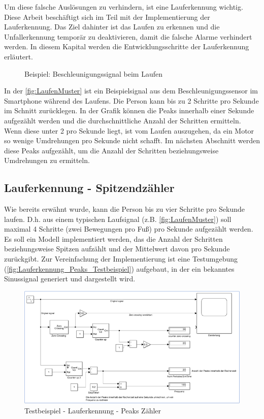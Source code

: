 Um diese falsche Auslösungen zu verhindern, ist eine Lauferkennung wichtig. Diese Arbeit beschäftigt sich im Teil mit der Implementierung der Lauferkennung. Das Ziel dahinter ist das Laufen zu erkennen und die Unfallerkennung temporär zu deaktivieren, damit die falsche Alarme verhindert werden.
In diesem Kapital werden die Entwicklungsschritte der Lauferkennung erläutert.

%

\begin{figure}[H]
	\centering
	\caption{Beispiel: Beschleunigungssignal beim Laufen}
	\label{fig:LaufenMuster}
\end{figure}
In der \autoref{fig:LaufenMuster} ist ein Beispielsignal aus dem Beschleunigungssensor im Smartphone während des Laufens. Die Person kann bis zu 2 Schritte pro Sekunde im Schnitt zurücklegen. In der Grafik können die Peaks innerhalb einer Sekunde aufgezählt werden und die durchschnittliche Anzahl der Schritten ermitteln. Wenn diese unter 2 pro Sekunde liegt, ist vom Laufen auszugehen, da ein Motor so wenige Umdrehungen pro Sekunde nicht schafft. Im nächsten Abschnitt werden diese Peaks aufgezählt, um die Anzahl der Schritten beziehungsweise Umdrehungen zu ermitteln.
%
\subsection{Lauferkennung - Spitzendzähler} \label{abs:PeaksAufzaehlen}

Wie bereits erwähnt wurde, kann die Person bis zu vier Schritte pro Sekunde laufen. D.h. aus einem typischen Laufsignal (z.B. \autoref{fig:LaufenMuster}) soll maximal 4 Schritte (zwei Bewegungen pro Fuß) pro Sekunde aufgezählt werden.
Es soll ein Modell implementiert werden, das die Anzahl der Schritten beziehungsweise Spitzen aufzählt und der Mittelwert davon pro Sekunde zurückgibt. Zur Vereinfachung der Implementierung ist eine Testumgebung (\autoref{fig:Lauferkennung_Peaks_Testbeispiel}) aufgebaut, in der ein bekanntes Sinussignal generiert und dargestellt wird.
\begin{figure}[H]
	\centering
	\includegraphics[width=\linewidth]{Bilder/Lauferkennung_Peaks_Testbeispiel.png}
	\caption{Testbeispiel - Lauferkennung - Peaks Zähler}
	\label{fig:Lauferkennung_Peaks_Testbeispiel}
\end{figure}

